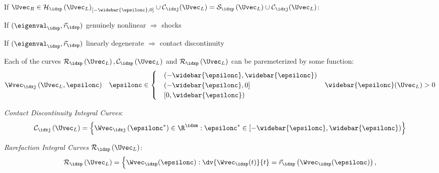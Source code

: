 \begin{sectionbox}
\begin{circlelistnosep}
\begin{itemizenosep}
       \end{itemizenosep}
       \item If $\Uvec_{R}\in\mathcal{H}_{\idxp}\left(\Uvec_{L}\right)_{[-\widebar{\epsilonc},0]}\cup\mathcal{C}_{\idxj}(\Uvec_{L})=\mathcal{S}_{\idxp}\left(\Uvec_{L}\right)\cup\mathcal{C}_{\idxj}(\Uvec_{L})$:
       \begin{itemizenosep}
           \item If $(\eigenval_{\idxp},\vec{r}_{\idxp})$ genuinely nonlinear $\Rightarrow$ shocks
           \item If $(\eigenval_{\idxp},\vec{r}_{\idxp})$ linearly degenerate $\Rightarrow$ contact discontinuity
       \end{itemizenosep}
   \end{circlelistnosep}
   Each of the curves $\mathcal{R}_{\idxp}\left(\Uvec_{L}\right),\mathcal{C}_{\idxp}\left(\Uvec_{L}\right)$ and $\mathcal{R}_{\idxp}\left(\Uvec_{L}\right)$ can be paremeterized by some function:
   \begin{align*}
     \Wvec_{\idxj}\left(\Uvec_{L},\epsilonc\right)&&\epsilonc\in
                                                     \begin{cases}
                                                       &(-\widebar{\epsilonc},\widebar{\epsilonc})\\
                                                       &(-\widebar{\epsilonc},0]\\
                                                       &[0,\widebar{\epsilonc})
                                                     \end{cases}&&\widebar{\epsilonc}(\Uvec_{L})>0
   \end{align*}
   \begin{itemizenosep}
       \item \textit{Contact Discontinuity Integral Curves}:
       \begin{align*}
          \mathcal{C}_{\idxj}\left(\Uvec_{L}\right)=\left\{\Wvec_{\idxj}\left(\epsilonc^{*}\right)\in\R^{\idxm}: \epsilonc^{*}\in[-\widebar{\epsilonc},\widebar{\epsilonc})\right\}
       \end{align*}
       \item \textit{Rarefaction Integral Curves} $\mathcal{R}_{\idxp}\left(\Uvec_{L}\right)$:
       \begin{align*}
         \mathcal{R}_{\idxp}\left(\Uvec_{L}\right)=
         \Big\{&\Wvec_{\idxp}(\epsilonc):
         \dv{\Wvec_{\idxp}(t)}{t}=\vec{r}_{\idxp}\left(\Wvec_{\idxp}(\epsilonc)\right),\\[-1\jot]

\end{align*}
\end{itemizenosep}
\end{sectionbox}
